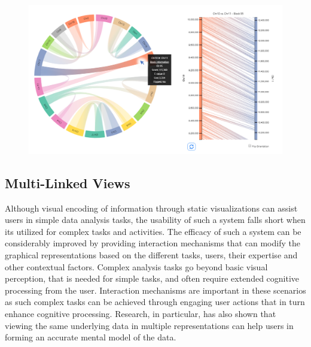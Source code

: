 \begin{figure}
  \centering
  \includegraphics[width=0.95\linewidth]{images/ch_2_accusyn.PNG}
  \label{fig:ch_2_accusyn}
\end{figure}


\subsection{Multi-Linked Views}

Although visual encoding of information through static visualizations can assist users in simple data analysis tasks, the usability of such a system falls short when its utilized for complex tasks and activities\cite{tominski2015interaction,dix1998starting,pike2009science,piringer2009multi,yi2007toward,sedig2013interaction}. The efficacy of such a system can be considerably improved by providing interaction mechanisms that can modify the graphical representations based on the different tasks, users, their expertise and other contextual factors\cite{sedig2013interaction}. Complex analysis tasks go beyond basic visual perception, that is needed for simple tasks, and often require extended cognitive processing from the user. Interaction mechanisms are important in these scenarios as such complex tasks can be achieved through engaging user actions that in turn enhance cognitive processing\cite{sedig2013interaction}. Research, in particular, has also shown that viewing the same underlying data in multiple representations can help users in forming an accurate mental model of the data\cite{larkin1987diagram,stenning1995cognitive,sedig2005designing,wang2000guidelines}.

